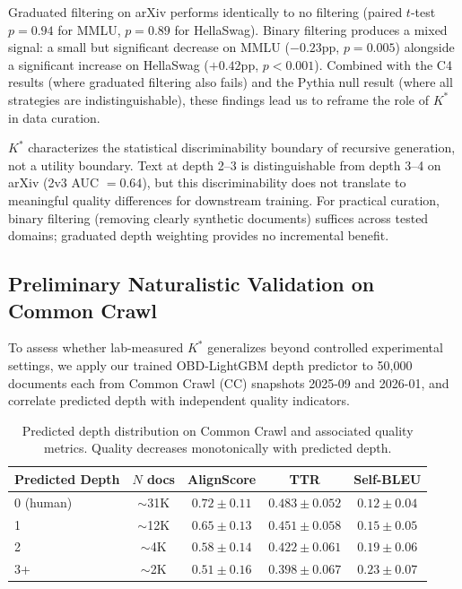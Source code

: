 \documentclass[11pt]{article}
\begin{document}
Graduated filtering on arXiv performs identically to no filtering (paired $t$-test $p = 0.94$ for MMLU, $p = 0.89$ for HellaSwag). Binary filtering produces a mixed signal: a small but significant decrease on MMLU ($-0.23$pp, $p{=}0.005$) alongside a significant increase on HellaSwag ($+0.42$pp, $p{<}0.001$). Combined with the C4 results (where graduated filtering also fails) and the Pythia null result (where all strategies are indistinguishable), these findings lead us to reframe the role of $K^*$ in data curation.

$K^*$ characterizes the statistical discriminability boundary of recursive generation, not a utility boundary. Text at depth 2--3 is distinguishable from depth 3--4 on arXiv (2v3 AUC $= 0.64$), but this discriminability does not translate to meaningful quality differences for downstream training. For practical curation, binary filtering (removing clearly synthetic documents) suffices across tested domains; graduated depth weighting provides no incremental benefit.

\subsection{Preliminary Naturalistic Validation on Common Crawl}
\label{sec:naturalistic}

To assess whether lab-measured $K^*$ generalizes beyond controlled experimental settings, we apply our trained OBD-LightGBM depth predictor to 50,000 documents each from Common Crawl (CC) snapshots 2025-09 and 2026-01, and correlate predicted depth with independent quality indicators.

\begin{table}[t]
\centering
\caption{Predicted depth distribution on Common Crawl and associated quality metrics. Quality decreases monotonically with predicted depth.}
\label{tab:cc-depth-quality}
\small
\begin{tabular}{lcccc}
\toprule
Predicted Depth & $N$ docs & AlignScore & TTR & Self-BLEU \\
\midrule
0 (human) & $\sim$31K & $0.72 \pm 0.11$ & $0.483 \pm 0.052$ & $0.12 \pm 0.04$ \\
1 & $\sim$12K & $0.65 \pm 0.13$ & $0.451 \pm 0.058$ & $0.15 \pm 0.05$ \\
2 & $\sim$4K & $0.58 \pm 0.14$ & $0.422 \pm 0.061$ & $0.19 \pm 0.06$ \\
3+ & $\sim$2K & $0.51 \pm 0.16$ & $0.398 \pm 0.067$ & $0.23 \pm 0.07$ \\
\bottomrule
\end{tabular}
\end{table}
\end{document}
